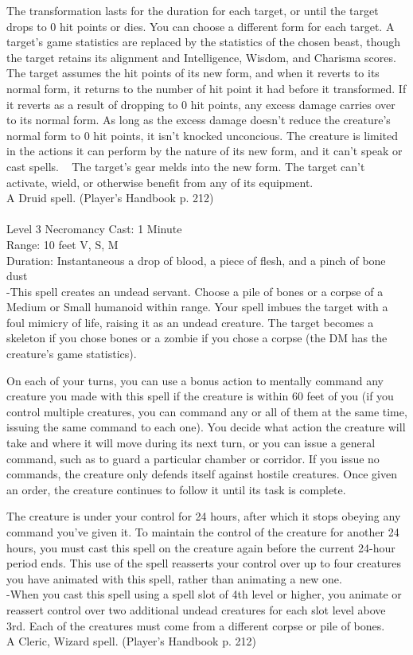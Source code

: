\documentclass[10pt,twocolumn]{report}
\begin{document}
The transformation lasts for the duration for each target, or until the target drops to 0 hit points or dies. You can choose a different form for each target. A target’s game statistics are replaced by the statistics of the chosen beast, though the target retains its alignment and Intelligence, Wisdom, and Charisma scores. The target assumes the hit points of its new form, and when it reverts to its normal form, it returns to the number of hit point it had before it transformed. If it reverts as a result of dropping to 0 hit points, any excess damage carries over to its normal form. As long as the excess damage doesn’t reduce the creature’s normal form to 0 hit points, it isn’t knocked unconcious. The creature is limited in the actions it can perform by the nature of its new form, and it can’t speak or cast spells. 
 
The target’s gear melds into the new form. The target can’t activate, wield, or otherwise benefit from any of its equipment.\\
A Druid spell. (Player's Handbook p. 212) \\


 \\
Level 3 \quad Necromancy \quad Cast: 1 Minute\\
Range: 10 feet \quad V, S, M\\
Duration: Instantaneous \quad a drop of blood, a piece of flesh, and a pinch of bone dust\\
-This spell creates an undead servant. 
Choose a pile of bones or a corpse of a Medium or Small humanoid within range. Your spell imbues the target with a foul mimicry of life, raising it as an undead creature. The target becomes a skeleton if you chose bones or a zombie if you chose a corpse (the DM has the creature’s game statistics). 

On each of your turns, you can use a bonus action to mentally command any creature you made with this spell if the creature is within 60 feet of you (if you control multiple creatures, you can command any or all of them at the same time, issuing the same command to each one). You decide what action the creature will take and where it will move during its next turn, or you can issue a general command, such as to guard a particular chamber or corridor. If you issue no commands, the creature only defends itself against hostile creatures. Once given an order, the creature continues to follow it until its task is complete.

The creature is under your control for 24 hours, after which it stops obeying any command you’ve given it. To maintain the control of the creature for another 24 hours, you must cast this spell on the creature again before the current 24-hour period ends. This use of the spell reasserts your control over up to four creatures you have animated with this spell, rather than animating a new one.\\
-When you cast this spell using a spell slot of 4th level or higher, you animate or reassert control over two additional undead creatures for each slot level above 3rd. Each of the creatures must come from a different corpse or pile of bones.\\
A Cleric, Wizard spell. (Player's Handbook p. 212) \\
\end{document}
